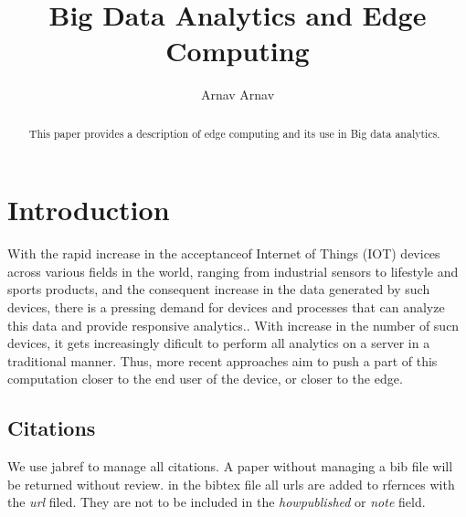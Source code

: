 \documentclass[sigconf]{acmart}
\begin{document}
\title{Big Data Analytics and Edge Computing}


\author{Arnav Arnav}



\begin{abstract}
This paper provides a description of edge computing and its use in Big data analytics.
\end{abstract}



\maketitle

\section{Introduction}

With the rapid increase in the acceptanceof Internet of Things (IOT) devices across various fields in the world, ranging from industrial sensors to lifestyle and sports products, and the consequent increase in the data generated by such devices, there is a pressing demand for devices and processes that can analyze this data and provide responsive analytics.\cite{ieee_iot_cloud_analytics_newsletter}. With increase in the number of sucn devices, it gets increasingly dificult to perform  all analytics on a server in a traditional manner. Thus, more recent approaches aim to push a part of this computation closer to the end user of the device, or closer to the edge.

\subsection{Citations}


We use jabref to manage all citations. A paper without managing a bib
file will be returned without review. in the bibtex file all urls are
added to rfernces with the {\it url} filed. They are not to be
included in the {\it howpublished} or {\it note} field. 





 
\end{document}
